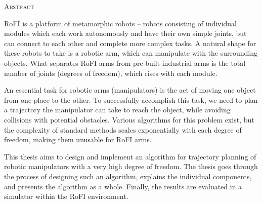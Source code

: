 \begin{center}
  \textsc{Abstract}
\end{center}
%
\noindent
%
RoFI is a platform of metamorphic robots -- robots consisting of individual modules which each work autonomously and have their own simple joints, but can connect to each other and complete more complex tasks. A natural shape for these robots to take is a robotic arm, which can manipulate with the surrounding objects. What separates RoFI arms from pre-built industrial arms is the total number of joints (degrees of freedom), which rises with each module.

An essential task for robotic arms (manipulators) is the act of moving one object from one place to the other. To successfully accomplish this task, we need to plan a trajectory the manipulator can take to reach the object, while avoiding collisions with potential obstacles. Various algorithms for this problem exist, but the complexity of standard methods scales exponentially with each degree of freedom, making them unusable for RoFI arms.

This thesis aims to design and implement an algorithm for trajectory planning of robotic manipulators with a very high degree of freedom. The thesis goes through the process of designing such an algorithm, explains the individual components, and presents the algorithm as a whole. Finally, the results are evaluated in a simulator within the RoFI environment.
